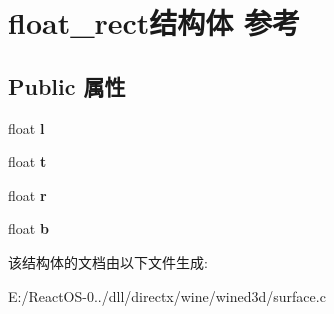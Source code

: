 \hypertarget{structfloat__rect}{}\section{float\+\_\+rect结构体 参考}
\label{structfloat__rect}
\subsection*{Public 属性}
\begin{DoxyCompactItemize}
\item 
\mbox{\label{structfloat__rect_a63d290b2d52304f8c5429c190194feb9}} 
float {\bfseries l}
\item 
\mbox{\label{structfloat__rect_a22f6a8ca07a22eff5e3708f857d92a09}} 
float {\bfseries t}
\item 
\mbox{\label{structfloat__rect_a7e6f4cff3b1edbf45e8469a1f70c9460}} 
float {\bfseries r}
\item 
\mbox{\label{structfloat__rect_a8dae4bcd83810e29190c86f4129a09a9}} 
float {\bfseries b}
\end{DoxyCompactItemize}


该结构体的文档由以下文件生成\+:\begin{DoxyCompactItemize}
\item 
E\+:/\+React\+O\+S-\/0../dll/directx/wine/wined3d/surface.\+c\end{DoxyCompactItemize}
